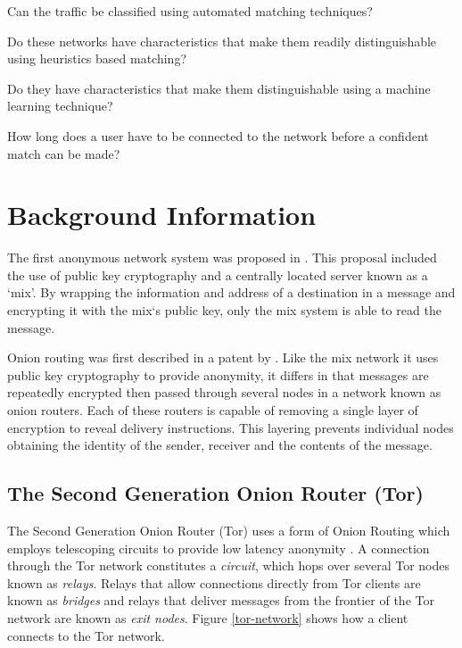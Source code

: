 \documentclass{conference}
\begin{document}
\begin{enumerate*}
\item Can the traffic be classified using automated matching techniques?
\item Do these networks have characteristics that make them readily distinguishable using heuristics based matching?
\item Do they have characteristics that make them distinguishable using a machine learning technique?
\item How long does a user have to be connected to the network before a confident match can be made?
\end{enumerate*}

\section{Background Information}

The first anonymous network system was proposed in \textcite{Chaum:1981p296}. This proposal included the use of public key cryptography and a centrally located server known as a `mix'. By wrapping the information and address of a destination in a message and encrypting it with the mix`s public key, only the mix system is able to read the message.

Onion routing was first described in a patent by \cite{Michael:2001}. Like the mix network it uses public key cryptography to provide anonymity, it differs in that messages are repeatedly encrypted then passed through several nodes in a network known as onion routers. Each of these routers is capable of removing a single layer of encryption to reveal delivery instructions. This layering prevents individual nodes obtaining the identity of the sender, receiver and the contents of the message.

\subsection{The Second Generation Onion Router (Tor)}

The Second Generation Onion Router (Tor) uses a form of Onion Routing which employs telescoping circuits to provide low latency anonymity \parencite{Dingledine:2004p314}. A connection through the Tor network constitutes a \emph{circuit}, which hops over several Tor nodes known as \emph{relays}. Relays that allow connections directly from Tor clients are known as \emph{bridges} and relays that deliver messages from the frontier of the Tor network are known as \emph{exit nodes}. Figure \ref{tor-network} shows how a client connects to the Tor network.
\end{document}
